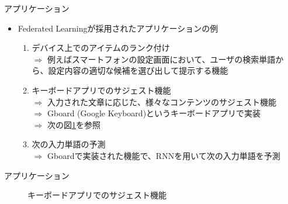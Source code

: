 \documentclass[dvipdfmx,notheorems,t]{beamer}
\begin{document}
\begin{frame}{アプリケーション}

\begin{itemize}
	\item Federated Learningが採用されたアプリケーションの例
	\begin{enumerate}
		\item デバイス上でのアイテムのランク付け \\
		$\Rightarrow$ 例えばスマートフォンの設定画面において、ユーザの検索単語から、設定内容の適切な候補を選び出して提示する機能
		\newline
		
		\item キーボードアプリでのサジェスト機能 \\
		$\Rightarrow$ 入力された文章に応じた、様々なコンテンツのサジェスト機能 \\
		$\Rightarrow$ Gboard (Google Keyboard)というキーボードアプリで実装 \\
		$\Rightarrow$ 次の図\ref{fig:federated-learning-content-suggestion}を参照
		\newline
		
		\item 次の入力単語の予測 \\
		$\Rightarrow$ Gboardで実装された機能で、RNNを用いて次の入力単語を予測
	\end{enumerate}
\end{itemize}

\end{frame}

\begin{frame}{アプリケーション}

\begin{figure}
	\centering
	\caption{キーボードアプリでのサジェスト機能~\cite{mcmahan_ramage_2017}}
	\label{fig:federated-learning-content-suggestion}
\end{figure}

\end{frame}
\end{document}
